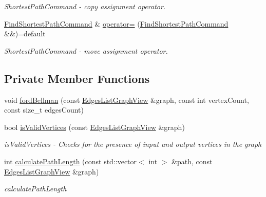 \begin{DoxyCompactItemize}
\begin{DoxyCompactList}\small\item\em Shortest\+Path\+Command -\/ copy assignment operator. \end{DoxyCompactList}\item 
\hyperlink{a00005}{Find\+Shortest\+Path\+Command} \& \hyperlink{a00005_acb8dc0308ded77e2873bb3caeb7043f2_acb8dc0308ded77e2873bb3caeb7043f2}{operator=} (\hyperlink{a00005}{Find\+Shortest\+Path\+Command} \&\&)=default
\begin{DoxyCompactList}\small\item\em Shortest\+Path\+Command -\/ move assignment operator. \end{DoxyCompactList}\end{DoxyCompactItemize}
\subsection*{Private Member Functions}
\begin{DoxyCompactItemize}
\item 
void \hyperlink{a00005_aaa85abbc782e92802f88fe94e8b39623_aaa85abbc782e92802f88fe94e8b39623}{ford\+Bellman} (const \hyperlink{a00037_aa7134896d837083f384364b56a32bb49_aa7134896d837083f384364b56a32bb49}{Edges\+List\+Graph\+View} \&graph, const int vertex\+Count, const size\+\_\+t edges\+Count)
\item 
bool \hyperlink{a00005_a7e7ff6cdcf150a9f4d90f44380109099_a7e7ff6cdcf150a9f4d90f44380109099}{is\+Valid\+Vertices} (const \hyperlink{a00037_aa7134896d837083f384364b56a32bb49_aa7134896d837083f384364b56a32bb49}{Edges\+List\+Graph\+View} \&graph)
\begin{DoxyCompactList}\small\item\em is\+Valid\+Vertices -\/ Checks for the presence of input and output vertices in the graph \end{DoxyCompactList}\item 
int \hyperlink{a00005_a01eddf0413a37843ec50f9c6da29435e_a01eddf0413a37843ec50f9c6da29435e}{calculate\+Path\+Length} (const std\+::vector$<$ int $>$ \&path, const \hyperlink{a00037_aa7134896d837083f384364b56a32bb49_aa7134896d837083f384364b56a32bb49}{Edges\+List\+Graph\+View} \&graph)
\begin{DoxyCompactList}\small\item\em calculate\+Path\+Length \end{DoxyCompactList}\end{DoxyCompactItemize}
